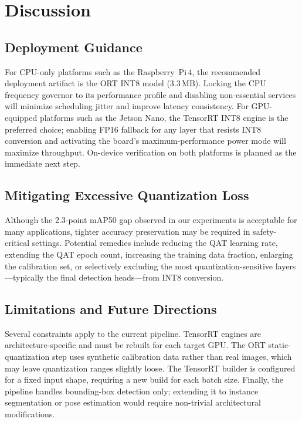 \documentclass[conference]{IEEEtran}
\begin{document}
\section{Discussion}

\subsection{Deployment Guidance}

For CPU-only platforms such as the Raspberry~Pi\,4, the recommended deployment artifact is the ORT INT8 model (3.3\,MB). Locking the CPU frequency governor to its performance profile and disabling non-essential services will minimize scheduling jitter and improve latency consistency. For GPU-equipped platforms such as the Jetson Nano, the TensorRT INT8 engine is the preferred choice; enabling FP16 fallback for any layer that resists INT8 conversion and activating the board's maximum-performance power mode will maximize throughput. On-device verification on both platforms is planned as the immediate next step.

\subsection{Mitigating Excessive Quantization Loss}

Although the 2.3-point mAP50 gap observed in our experiments is acceptable for many applications, tighter accuracy preservation may be required in safety-critical settings. Potential remedies include reducing the QAT learning rate, extending the QAT epoch count, increasing the training data fraction, enlarging the calibration set, or selectively excluding the most quantization-sensitive layers---typically the final detection heads---from INT8 conversion.

\subsection{Limitations and Future Directions}

Several constraints apply to the current pipeline. TensorRT engines are architecture-specific and must be rebuilt for each target GPU. The ORT static-quantization step uses synthetic calibration data rather than real images, which may leave quantization ranges slightly loose. The TensorRT builder is configured for a fixed input shape, requiring a new build for each batch size. Finally, the pipeline handles bounding-box detection only; extending it to instance segmentation or pose estimation would require non-trivial architectural modifications.
\end{document}
